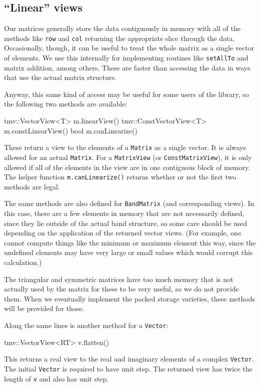 \documentclass[twoside,letterpaper,11pt]{article}
\renewcommand{\tt}[1]{{\lstinline {#1}}}
\begin{document}
\subsection{``Linear'' views}
\label{LinearViews}

Our matrices generally store the data contiguously in memory with all of the 
methods like \tt{row} and \tt{col} returning the appropriate slice through the
data.  Occasionally, though, it can be useful to treat the whole matrix
as a single vector of elements.  We use this internally for implementing routines
like \tt{setAllTo} and matrix addition, among others.  These are faster than
accessing the data in ways that use the actual matrix structure.

Anyway, this same kind of access may be useful for some users of the library, 
so the following two methods are available:
\begin{tmvcode}
tmv::VectorView<T> m.linearView()
tmv::ConstVectorView<T> m.constLinearView()
bool m.canLinearize()
\end{tmvcode}
These return a view to the elements of a \tt{Matrix} as a single vector.  
It is always allowed for an actual \tt{Matrix}.  For a \tt{MatrixView} 
(or \tt{ConstMatrixView}), it is only allowed if all of the elements in the 
view are in one contiguous block of memory.  The helper function 
\tt{m.canLinearize()} returns whether or not the first two methods are legal.

The same methods are also defined for \tt{BandMatrix} (and corresponding views).
In this case, there are a few elements in memory that are not necessarily
defined, since they lie outside of the actual band structure, so some care
should be used depending on the application of the returned vector views.  
(For example, one cannot compute things like the
minimum or maximum element this way, since the undefined elements may
have very large or small values which would corrupt this calculation.)

The triangular and symmetric matrices have too much memory that is not
actually used by the matrix for these to be very useful, so we do not provide them.
When we eventually implement the packed storage varieties, these methods will
be provided for those.

Along the same lines is another method for a \tt{Vector}:
\begin{tmvcode}
tmv::VectorView<RT> v.flatten()
\end{tmvcode}
This returns a real view to the real and imaginary elements of a complex \tt{Vector}. 
The initial \tt{Vector} is required to have unit step.  The returned view has twice the 
length of \tt{v} and also has unit step.
\end{document}
